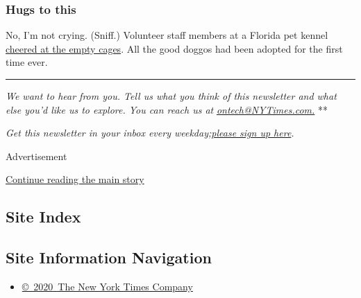 \hypertarget{hugs-to-this}{%
\subsubsection{Hugs to this}\label{hugs-to-this}}

No, I'm not crying. (Sniff.) Volunteer staff members at a Florida pet
kennel \href{https://twitter.com/ABC/status/1250574504046161920}{cheered
at the empty cages}. All the good doggos had been adopted for the first
time ever.

\begin{center}\rule{0.5\linewidth}{\linethickness}\end{center}

\emph{We want to hear from you. Tell us what you think of this
newsletter and what else you'd like us to explore. You can reach us at}
\href{mailto:ontech@NYTimes.com?subject=On\%20Tech\%20Feedback}{\emph{ontech@NYTimes.com.}}
**

\emph{Get this newsletter in your inbox every
weekday;}\href{https://www.nytimes3xbfgragh.onion/newsletters/signup/OT}{\emph{please
sign up here}}\emph{.}

Advertisement

\protect\hyperlink{after-bottom}{Continue reading the main story}

\hypertarget{site-index}{%
\subsection{Site Index}\label{site-index}}

\hypertarget{site-information-navigation}{%
\subsection{Site Information
Navigation}\label{site-information-navigation}}

\begin{itemize}
\tightlist
\item
  \href{https://help.nytimes3xbfgragh.onion/hc/en-us/articles/115014792127-Copyright-notice}{©~2020~The
  New York Times Company}
\end{itemize}

